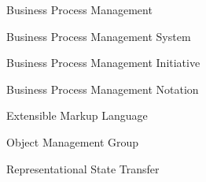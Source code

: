 \item [BPM] Business Process Management
\item [BPMS] Business Process Management System
\item [BPMI] Business Process Management Initiative
\item [BPMN] Business Process Management Notation
\item [XML] Extensible Markup Language
\item [OMG] Object Management Group
\item [REST] Representational State Transfer


